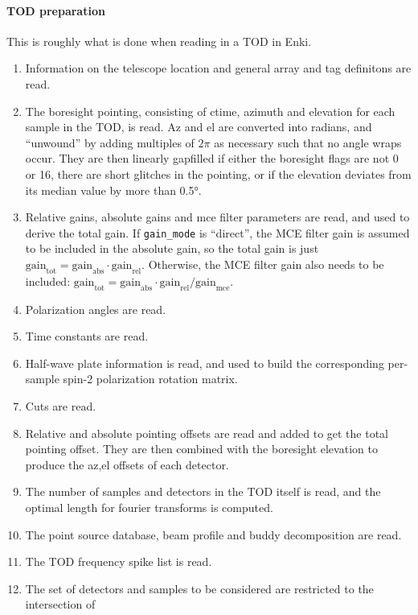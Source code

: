 \documentclass[a4paper, 11pt]{article}
\begin{document}
\paragraph{TOD preparation}
This is roughly what is done when reading in a TOD in Enki.
\begin{enumerate}
\item Information on the telescope location and general array and tag definitons are read.
\item The boresight pointing, consisting of ctime, azimuth and elevation for each sample
	in the TOD, is read. Az and el are converted into radians, and ``unwound'' by adding
		multiples of $2\pi$ as necessary such that no angle wraps occur. They are then linearly
		gapfilled if either the boresight flags are not 0 or 16, there are short glitches in
		the pointing, or if the elevation deviates from its median value by more than \ang{0.5}.
\item Relative gains, absolute gains and mce filter parameters are read, and used to derive the
	total gain. If \texttt{gain\_mode} is ``direct'', the MCE filter gain is assumed to be included
		in the absolute gain, so the total gain is just $\textrm{gain}_\textrm{tot} =
		\textrm{gain}_\textrm{abs} \cdot \textrm{gain}_\textrm{rel}$. Otherwise, the MCE filter gain
		also needs to be included: $\textrm{gain}_\textrm{tot} =
		\textrm{gain}_\textrm{abs} \cdot \textrm{gain}_\textrm{rel} / \textrm{gain}_\textrm{mce}$.
\item Polarization angles are read.
\item Time constants are read.
\item Half-wave plate information is read, and used to build the corresponding per-sample
	spin-2 polarization rotation matrix.
\item Cuts are read.
\item Relative and absolute pointing offsets are read and added to get the total pointing offset.
	They are then combined with the boresight elevation to produce the az,el offsets of each detector.
\item The number of samples and detectors in the TOD itself is read, and the optimal length for
	fourier transforms is computed.
\item The point source database, beam profile and buddy decomposition are read.
\item The TOD frequency spike list is read.
\item The set of detectors and samples to be considered are restricted to the intersection of

\end{enumerate}
\end{document}
